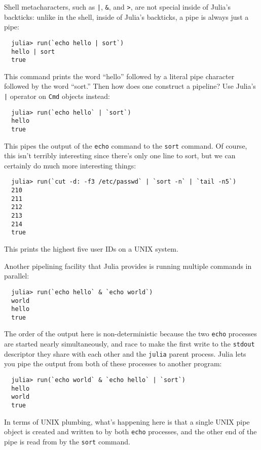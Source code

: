 \documentclass{article}
\begin{document}
Shell metacharacters, such as \texttt{|}, \verb|&|, and \verb|>|, are not special inside of Julia's backticks:
unlike in the shell, inside of Julia's backticks, a pipe is always just a pipe:
\begin{verbatim}
  julia> run(`echo hello | sort`)
  hello | sort
  true
\end{verbatim}
This command prints the word ``hello'' followed by a literal pipe character followed by the word ``sort.''
Then how does one construct a pipeline?
Use Julia's \texttt{|} operator on \verb|Cmd| objects instead:
\begin{verbatim}
  julia> run(`echo hello` | `sort`)
  hello
  true
\end{verbatim}
This pipes the output of the \verb|echo| command to the \verb|sort| command.
Of course, this isn't terribly interesting since there's only one line to sort, but we can certainly do much more interesting things:
\begin{verbatim}
  julia> run(`cut -d: -f3 /etc/passwd` | `sort -n` | `tail -n5`)
  210
  211
  212
  213
  214
  true
\end{verbatim}
This prints the highest five user IDs on a UNIX system.

Another pipelining facility that Julia provides is running multiple commands in parallel:
\begin{verbatim}
  julia> run(`echo hello` & `echo world`)
  world
  hello
  true
\end{verbatim}
The order of the output here is non-deterministic because the two \verb|echo| processes are started nearly simultaneously, and race to make the first write to the \verb|stdout| descriptor they share with each other and the \verb|julia| parent process.
Julia lets you pipe the output from both of these processes to another program:
\begin{verbatim}
  julia> run(`echo world` & `echo hello` | `sort`)
  hello
  world
  true
\end{verbatim}
In terms of UNIX plumbing, what's happening here is that a single UNIX pipe object is created and written to by both \verb|echo| processes, and the other end of the pipe is read from by the \verb|sort| command.
\end{document}
